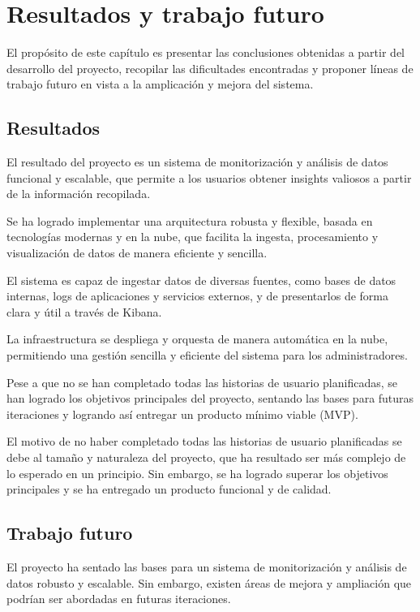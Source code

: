 \chapter{Resultados y trabajo futuro}\label{chap:concl}
El propósito de este capítulo es presentar las conclusiones obtenidas a partir
del desarrollo del proyecto, recopilar las dificultades encontradas y proponer
líneas de trabajo futuro en vista a la amplicación y mejora del sistema.

\section{Resultados}
El resultado del proyecto es un sistema de monitorización y análisis de datos
funcional y escalable, que permite a los usuarios obtener insights valiosos a
partir de la información recopilada.

Se ha logrado implementar una arquitectura robusta y flexible, basada en
tecnologías modernas y en la nube, que facilita la ingesta, procesamiento y
visualización de datos de manera eficiente y sencilla.

El sistema es capaz de ingestar datos de diversas fuentes, como bases de datos
internas, logs de aplicaciones y servicios externos, y de presentarlos de forma
clara y útil a través de Kibana.

La infraestructura se despliega y orquesta de manera automática en la nube,
permitiendo una gestión sencilla y eficiente del sistema para los
administradores.

Pese a que no se han completado todas las historias de usuario planificadas,
se han logrado los objetivos principales del proyecto, sentando las bases para
futuras iteraciones y logrando así entregar un producto mínimo viable (MVP).

El motivo de no haber completado todas las historias de usuario planificadas
se debe al tamaño y naturaleza del proyecto, que ha resultado ser más complejo
de lo esperado en un principio. Sin embargo, se ha logrado superar los objetivos
principales y se ha entregado un producto funcional y de calidad.


\newpage{}
\section{Trabajo futuro}
El proyecto ha sentado las bases para un sistema de monitorización y análisis de
datos robusto y escalable. Sin embargo, existen áreas de mejora y ampliación que
podrían ser abordadas en futuras iteraciones.


